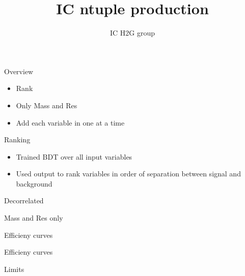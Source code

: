 \documentclass[t]{beamer}
\author{IC H2G group}
\title[IC ntuple production]{IC ntuple production}
\begin{document}


\begin{frame}{Overview}
  \begin{itemize}  
   \item Rank
   \item Only Mass and Res
   \item Add each variable in one at a time
   \end{itemize}
\end{frame}

\begin{frame}{Ranking}
  \begin{itemize}  
   \item Trained BDT over all input variables 
   \item Used output to rank variables in order of separation between signal and
background
   \end{itemize}
\end{frame}


\begin{frame}{Decorrelated}
  \begin{center}
  \end{center}
\end{frame}

\begin{frame}{Mass and Res only}
  \begin{center}
  \end{center}
\end{frame}

\begin{frame}{Efficieny curves}
  \begin{center}
  \end{center}
\end{frame}

\begin{frame}{Efficieny curves}
  \begin{center}
  \end{center}
\end{frame}

\begin{frame}{Limits}
  \begin{center}
  \end{center}
\end{frame}
\end{document}
